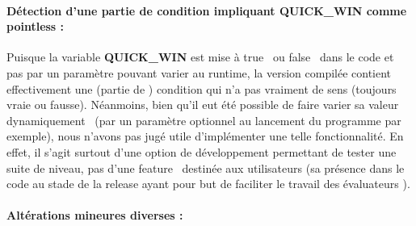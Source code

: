 \documentclass[12pt, openany]{report}
\begin{document}
\paragraph{Détection d'une partie de condition impliquant QUICK\_WIN comme \og pointless \fg : } 
Puisque la variable \textbf{QUICK\_WIN} est mise à \og true \fg \, ou \og false \fg \, dans le code et pas par un paramètre pouvant varier au runtime, la version compilée contient effectivement une (partie de ) condition qui n'a pas vraiment de sens (toujours vraie ou fausse).
Néanmoins, bien qu'il eut été possible de faire varier sa valeur \og dynamiquement \fg \, (par un paramètre optionnel au lancement du programme par exemple), nous n'avons pas jugé utile d'implémenter une telle fonctionnalité. En effet, il s'agit surtout d'une option de développement permettant de tester une suite de niveau, pas d'une \og feature \fg \, destinée aux utilisateurs (sa présence dans le code au stade de la release ayant pour but de faciliter le travail des \og évaluateurs \fg).
\paragraph{Altérations mineures diverses : }
\end{document}
